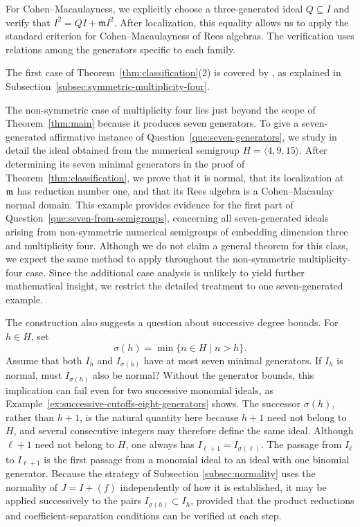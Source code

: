 For Cohen–Macaulayness, we explicitly choose a three-generated ideal $Q\subseteq I$ and verify that $I^2=QI+\mathfrak mI^2$. 
After localization, this equality allows us to apply the standard criterion for Cohen–Macaulayness of Rees algebras. 
The verification uses relations among the generators specific to each family.


The first case of Theorem~\ref{thm:classification}(2) is covered by
\cite[Theorem~2.1]{EndoGotoHongUlrich2026}, as explained in
Subsection~\ref{subsec:symmetric-multiplicity-four}.

The non-symmetric case of multiplicity four lies just beyond the scope of
Theorem~\ref{thm:main} because it produces seven generators.  To give a seven-generated
affirmative instance of Question~\ref{que:seven-generators}, we study in
detail the ideal obtained from the numerical semigroup
$H=\langle4,9,15\rangle$.  After determining its seven minimal generators in
the proof of Theorem~\ref{thm:classification}, we prove that it is normal,
that its localization at $\mathfrak m$ has reduction number one, and that its Rees
algebra is a Cohen--Macaulay normal domain.  This example provides evidence
for the first part of Question~\ref{que:seven-from-semigroups}, concerning
all seven-generated ideals arising from non-symmetric numerical semigroups of
embedding dimension three and multiplicity four.  Although we do not claim a general theorem for this class,
we expect the same method to apply throughout the non-symmetric
multiplicity-four case. Since the additional case analysis is unlikely to
yield further mathematical insight, we restrict the detailed treatment to
one seven-generated example.

The construction also suggests a question about successive degree bounds.
For $h\in H$, set
\[
 \sigma(h)=\min\{n\in H\mid n>h\}.
\]
Assume that both $I_h$ and $I_{\sigma(h)}$ have at most seven minimal
generators.  If $I_h$ is normal, must $I_{\sigma(h)}$ also be normal?
Without the generator bounds, this implication can fail even for two
successive monomial ideals, as Example~\ref{ex:successive-cutoffs-eight-generators}
shows.  The successor
$\sigma(h)$, rather than $h+1$, is the natural quantity here because $h+1$
need not belong to $H$, and several consecutive integers may therefore define
the same ideal.  Although $\ell+1$ need not belong to $H$, one always has
$I_{\ell+1}=I_{\sigma(\ell)}$.  The passage from $I_\ell$ to
$I_{\ell+1}$ is the first passage from a monomial ideal to
an ideal with one binomial generator.  
Because the strategy of Subsection \ref{subsec:normality} uses the normality of $J=I+(f)$ independently of how it is established, it may be applied successively to the pairs $I_{\sigma(h)}\subset I_h$, provided that the product reductions and coefficient-separation conditions can be verified at each step.

